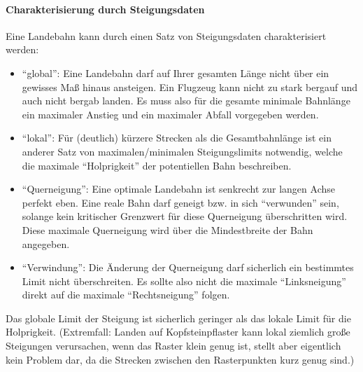 \documentclass[
11pt, %
a4paper, %
oneside, %
pdfspacing, %
headinclude,
BCOR5mm, %
ngerman, %
bibtotocnumbered,
]{scrartcl}
\begin{document}
	\paragraph{Charakterisierung durch Steigungsdaten}
	Eine Landebahn kann durch einen Satz von Steigungsdaten charakterisiert werden:
	\begin{itemize}
		\item "`global"': Eine Landebahn darf auf Ihrer gesamten Länge nicht über ein gewisses Maß hinaus ansteigen. Ein Flugzeug kann nicht zu stark bergauf und auch nicht bergab landen. Es muss also für die gesamte minimale Bahnlänge ein maximaler Anstieg und ein maximaler Abfall vorgegeben werden.
		\item "`lokal"': Für (deutlich) kürzere Strecken als die Gesamtbahnlänge ist ein anderer Satz von maximalen/minimalen Steigungslimits notwendig, welche die maximale "`Holprigkeit"' der potentiellen Bahn beschreiben.
		\item "`Querneigung"': Eine optimale Landebahn ist senkrecht zur langen Achse perfekt eben. Eine reale Bahn darf geneigt bzw. in sich "`verwunden"' sein, solange kein kritischer Grenzwert für diese Querneigung überschritten wird. Diese maximale Querneigung wird über die Mindestbreite der Bahn angegeben.
		\item "`Verwindung"': Die Änderung der Querneigung darf sicherlich ein bestimmtes Limit nicht überschreiten. Es sollte also nicht die maximale "`Linksneigung"' direkt auf die maximale "`Rechtsneigung"' folgen.
	\end{itemize}

	Das globale Limit der Steigung ist sicherlich geringer als das lokale Limit für die Holprigkeit. (Extremfall: Landen auf Kopfsteinpflaster kann lokal ziemlich große Steigungen verursachen, wenn das Raster klein genug ist, stellt aber eigentlich kein Problem dar, da die Strecken zwischen den Rasterpunkten kurz genug sind.)
	
\end{document}

